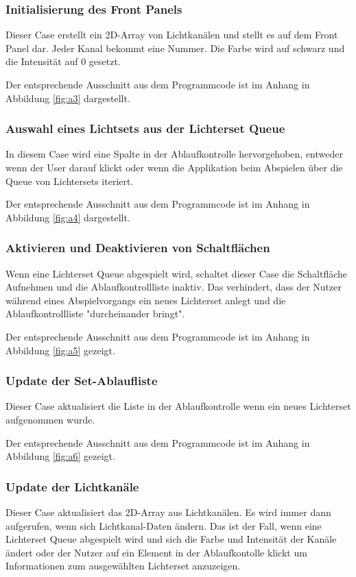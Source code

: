
\subsubsection{Initialisierung des Front Panels}
Dieser Case erstellt ein 2D-Array von Lichtkanälen und stellt es auf dem Front Panel dar. Jeder Kanal bekommt eine Nummer. Die Farbe wird auf schwarz und die Intensität auf 0 gesetzt. 

Der entsprechende Ausschnitt aus dem Programmcode ist im Anhang in Abbildung \ref{fig:a3} dargestellt.

\subsubsection{Auswahl eines Lichtsets aus der Lichterset Queue}
In diesem Case wird eine Spalte in der Ablaufkontrolle hervorgehoben, entweder wenn der User darauf klickt oder wenn die Applikation beim Abspielen über die Queue von Lichtersets iteriert. 

Der entsprechende Ausschnitt aus dem Programmcode ist im Anhang in Abbildung \ref{fig:a4} dargestellt.
 
\subsubsection{Aktivieren und Deaktivieren von Schaltflächen}
Wenn eine Lichterset Queue abgespielt wird, schaltet dieser Case die Schaltfläche Aufnehmen und die Ablaufkontrollliste inaktiv. 
Das verhindert, dass der Nutzer während eines Abspielvorgangs ein neues Lichterset anlegt und die Ablaufkontrollliste "durcheinander bringt".

Der entsprechende Ausschnitt aus dem Programmcode ist im Anhang in Abbildung \ref{fig:a5} gezeigt.

\subsubsection{Update der Set-Ablaufliste}
Dieser Case aktualisiert die Liste in der Ablaufkontrolle wenn ein neues Lichterset aufgenommen wurde.

Der entsprechende Ausschnitt aus dem Programmcode ist im Anhang in Abbildung \ref{fig:a6} gezeigt.

\subsubsection{Update der Lichtkanäle}
Dieser Case aktualisiert das 2D-Array aus Lichtkanälen. Es wird immer dann aufgerufen, wenn sich Lichtkanal-Daten ändern. 
Das ist der Fall, wenn eine Lichterset Queue abgespielt wird und sich die Farbe und Intensität der Kanäle ändert oder der Nutzer auf ein Element in der Ablaufkontolle klickt
um  Informationen zum ausgewählten Lichterset anzuzeigen.

